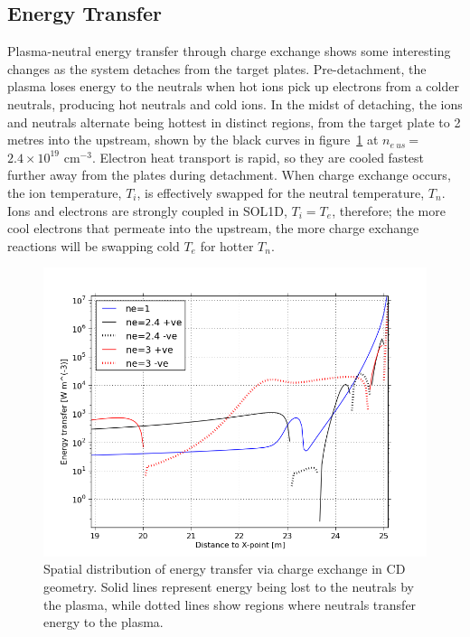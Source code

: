 \documentclass[12pt]{article}  %
\providecommand{\noNe}[1]{{${#1}\times 10^{19}$ cm$^{-3}$}} %
\providecommand{\neus}{$n_{e~us}~$} %
\begin{document}
\subsection{Energy Transfer}\label{ssecEtrans}
Plasma-neutral energy transfer through charge exchange shows some interesting changes as the system detaches from the target plates. Pre-detachment, the plasma loses energy to the neutrals when hot ions pick up electrons from a colder neutrals, producing hot neutrals and cold ions. In the midst of detaching, the ions and neutrals alternate being hottest in distinct regions, from the target plate to 2 metres into the upstream, shown by the black curves in figure~\ref{figbalEcx19m} at \neus = \noNe{2.4}. Electron heat transport is rapid, so they are cooled fastest further away from the plates during detachment. When charge exchange occurs, the ion temperature, $T_i$, is effectively swapped for the neutral temperature, $T_n$. Ions and electrons are strongly coupled in SOL1D, $T_i = T_e$, therefore; the more cool electrons that permeate into the upstream, the more charge exchange reactions will be swapping cold $T_e$ for hotter $T_n$.

\begin{figure}
\includegraphics[scale=0.5]{Figures/sol1d/balEcx19m.png}
\centering
\caption{Spatial distribution of energy transfer via charge exchange in CD geometry. Solid lines represent energy being lost to the neutrals by the plasma, while dotted lines show regions where neutrals transfer energy to the plasma.}\label{figbalEcx19m}
\end{figure}
\end{document}
